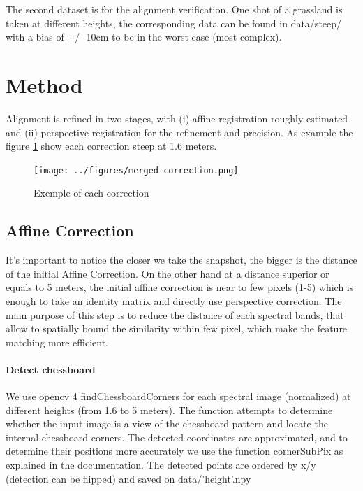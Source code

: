\documentclass[]{elsarticle}
\begin{document}
	The second dataset is for the alignment verification. One shot of a grassland is taken at different heights, the corresponding data can be found in data/steep/
	with a bias of +/- 10cm to be in the worst case (most complex).
	
	\newpage
	\section{Method}
	
	Alignment is refined in two stages, with
	(i) affine registration roughly estimated
	and (ii) perspective registration for the refinement and precision.
	As example the figure \ref{fig:merged-correction} show each correction steep at 1.6 meters.
	
	\begin{figure}[!htb]
		\centering
		\texttt{[image: ../figures/merged-correction.png]}
		\caption{Exemple of each correction}
		\label{fig:merged-correction}
	\end{figure}
	
	\subsection{Affine Correction}
	
	It's important to notice the closer we take the snapshot, the bigger is the distance of the initial Affine Correction.
	On the other hand at a distance superior or equals to 5 meters,
	the initial affine correction is near to few pixels (1-5) which is enough to take an identity matrix and directly use perspective correction.
	The main purpose of this step is to reduce the distance of each spectral bands,
	that allow to spatially bound the similarity within few pixel,
	which make the feature matching more efficient.
	
	\paragraph{Detect chessboard} We use opencv 4 findChessboardCorners for each spectral image (normalized) at different heights (from 1.6 to 5 meters).
	The function attempts to determine whether the input image is a view of the chessboard pattern and locate the internal chessboard corners.
	The detected coordinates are approximated, and to determine their positions more accurately we use the function cornerSubPix as explained in the documentation.
	The detected points are ordered by x/y (detection can be flipped) and saved on data/'height'.npy
	
\end{document}
